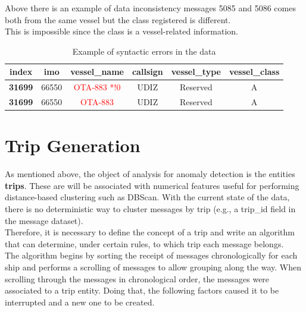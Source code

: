     Above there is an example of data inconsistency messages 5085 and 5086 comes both from the same vessel but the class registered is different.
    \\
    This is impossible since the class is a vessel-related information.
    
    
    \bigbreak
    
    \begin{table}[H]
    \begin{tabular}{|c|c|c|c|c|c|}
        \hline
            \textbf{index} & \textbf{imo} & \textbf{vessel\_name} & \textbf{callsign} & \textbf{vessel\_type} & \textbf{vessel\_class} \\
        \hline
            \textbf{31699} & 66550      & \textcolor{red}{OTA-883 *!0}   & UDIZ              & Reserved               & A      \\
            \textbf{31699} & 66550      & \textcolor{red}{OTA-883}   & UDIZ              & Reserved               & A      \\
        \hline
    \end{tabular}
    \caption{Example of syntactic errors in the data}
    \end{table}

\clearpage
\section{Trip Generation}

    As mentioned above, the object of analysis for anomaly detection is the entities \textbf{trips}. These are will be associated with numerical features useful for performing distance-based clustering such as DBScan. With the current state of the data, there is no deterministic way to cluster messages by trip (e.g., a trip\_id field in the message dataset).
    \\
    Therefore, it is necessary to define the concept of a trip and write an algorithm that can determine, under certain rules, to which trip each message belongs.
    \\
    The algorithm begins by sorting the receipt of messages chronologically for each ship and performs a scrolling of messages to allow grouping along the way.
    When scrolling through the messages in chronological order, the messages were associated to a trip entity. Doing that, the following factors caused it to be interrupted and a new one to be created.
    
